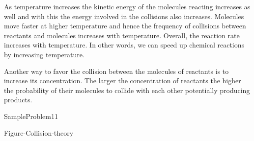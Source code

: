 \documentclass[main.tex]{subfiles}
\newcommand\chapterlabel{Ch-kinetics}
\begin{document}
\begin{description}
\begin{minipage}[b]{1.0\linewidth}
{
}\end{minipage}
\item[\docfilehook{Effect of temperature}{}] 
As temperature increases the kinetic energy of the molecules reacting increases as well and with this the energy involved in the collisions also increases. Molecules move faster at higher temperature and hence the frequency of collisions between reactants and molecules increases with temperature. Overall, the reaction rate increases with temperature. In other words, we can speed up chemical reactions by increasing temperature.
\item[\docfilehook{Concentration of reactants}{}] 
Another way to favor the collision between the molecules of reactants is to increase its concentration. The larger the concentration of reactants the higher the probability of their molecules to collide with each other potentially producing products.

  {SampleProblem11}



\hspace{2cm}\vspace{1cm}  {Figure-Collision-theory} \newpage


\end{description}
\end{document}

